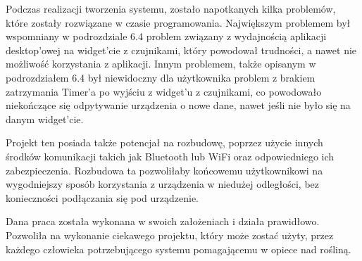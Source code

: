 \documentclass[a4paper,twoside,12pt]{book}
\begin{document}
Podczas realizacji tworzenia systemu, zostało napotkanych kilka problemów, które zostały rozwiązane w czasie programowania. Największym problemem był wspomniany w podrozdziale 6.4 problem związany z wydajnością aplikacji desktop'owej na widget'cie z czujnikami, który powodował trudności, a nawet nie możliwość korzystania z aplikacji. Innym problemem, także opisanym w podrozdziałem 6.4 był niewidoczny dla użytkownika problem z brakiem zatrzymania Timer'a po wyjściu z widget'u z czujnikami, co powodowało niekończące się odpytywanie urządzenia o nowe dane, nawet jeśli nie było się na danym widget'cie.

Projekt ten posiada także potencjał na rozbudowę, poprzez użycie innych środków komunikacji takich jak Bluetooth lub WiFi oraz odpowiedniego ich zabezpieczenia. Rozbudowa ta pozwoliłaby końcowemu użytkownikowi na wygodniejszy sposób korzystania z urządzenia w niedużej odległości, bez konieczności podłączania się pod urządzenie.

Dana praca została wykonana w swoich założeniach i działa prawidłowo. Pozwoliła na wykonanie ciekawego projektu, który może zostać użyty, przez każdego człowieka potrzebującego systemu pomagającemu w opiece nad rośliną.



\end{document}
